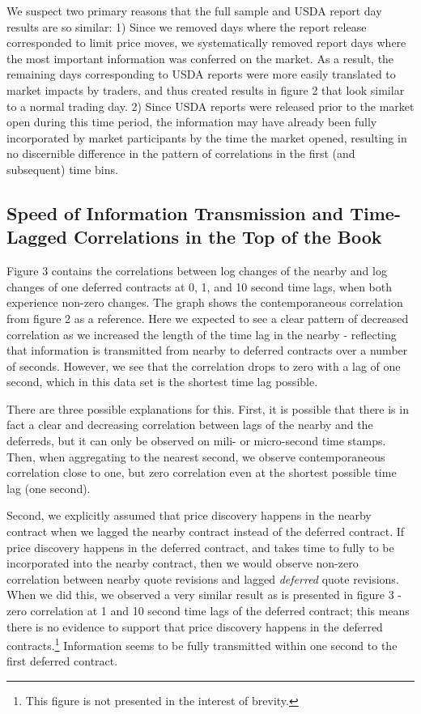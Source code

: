 \documentclass[]{elsarticle} %
\begin{document}
We suspect two primary reasons that the full sample and USDA report day
results are so similar: 1) Since we removed days where the report
release corresponded to limit price moves, we systematically removed
report days where the most important information was conferred on the
market. As a result, the remaining days corresponding to USDA reports
were more easily translated to market impacts by traders, and thus
created results in figure 2 that look similar to a normal trading day.
2) Since USDA reports were released prior to the market open during this
time period, the information may have already been fully incorporated by
market participants by the time the market opened, resulting in no
discernible difference in the pattern of correlations in the first (and
subsequent) time bins.

\subsection{Speed of Information Transmission and Time-Lagged
Correlations in the Top of the
Book}\label{speed-of-information-transmission-and-time-lagged-correlations-in-the-top-of-the-book-1}

Figure 3 contains the correlations between log changes of the nearby and
log changes of one deferred contracts at 0, 1, and 10 second time lags,
when both experience non-zero changes. The graph shows the
contemporaneous correlation from figure 2 as a reference. Here we
expected to see a clear pattern of decreased correlation as we increased
the length of the time lag in the nearby - reflecting that information
is transmitted from nearby to deferred contracts over a number of
seconds. However, we see that the correlation drops to zero with a lag
of one second, which in this data set is the shortest time lag possible.

There are three possible explanations for this. First, it is possible
that there is in fact a clear and decreasing correlation between lags of
the nearby and the deferreds, but it can only be observed on mili- or
micro-second time stamps. Then, when aggregating to the nearest second,
we observe contemporaneous correlation close to one, but zero
correlation even at the shortest possible time lag (one second).

Second, we explicitly assumed that price discovery happens in the nearby
contract when we lagged the nearby contract instead of the deferred
contract. If price discovery happens in the deferred contract, and takes
time to fully to be incorporated into the nearby contract, then we would
observe non-zero correlation between nearby quote revisions and lagged
\emph{deferred} quote revisions. When we did this, we observed a very
similar result as is presented in figure 3 - zero correlation at 1 and
10 second time lags of the deferred contract; this means there is no
evidence to support that price discovery happens in the deferred
contracts.\footnote{This figure is not presented in the interest of
  brevity.} Information seems to be fully transmitted within one second
to the first deferred contract.
\end{document}
